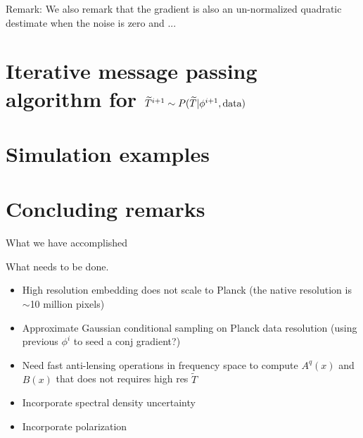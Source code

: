 \documentclass[noinfoline]{imsart}
\begin{document}
{\rm Remark:}
We also remark that the gradient is also an un-normalized quadratic destimate when the noise is zero and ...
\section{Iterative message passing algorithm for $\widetilde T^{i+1}\sim P(\widetilde T |  \phi^{i+1},\text{\rm data})$}


\section{Simulation examples}

\section{Concluding remarks}

What we have accomplished

What needs to be done.
\begin{itemize}
 \item High resolution embedding does not scale to Planck (the native resolution is $\sim$10 million pixels)
\item Approximate Gaussian conditional sampling on Planck data resolution (using previous $\phi^{i}$ to seed a conj gradient?)
\item Need fast anti-lensing operations in frequency space to compute $A^q(x)$ and $B(x)$ that does not requires high res $\tilde T$
\item Incorporate spectral density uncertainty
\item Incorporate polarization
\end{itemize}


\appendix
\end{document}

